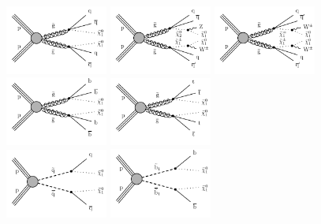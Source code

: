 \begin{figure}[htbp]
  \centering
    \includegraphics[width=0.3\textwidth]{figs/results/T1qqqq.pdf}
    \includegraphics[width=0.3\textwidth]{figs/results/T5qqqqWZ.pdf}
    \includegraphics[width=0.3\textwidth]{figs/results/T5qqqqWW.pdf}\\
    \includegraphics[width=0.3\textwidth]{figs/results/T1bbbb.pdf}
    \includegraphics[width=0.3\textwidth]{figs/results/T1tttt.pdf} \\
    \includegraphics[width=0.3\textwidth]{figs/results/T2qq.pdf}
    \includegraphics[width=0.3\textwidth]{figs/results/T2bb.pdf}

\end{figure}
